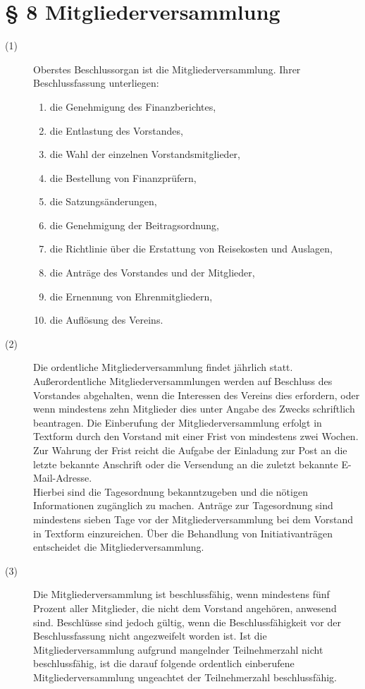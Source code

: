 \documentclass[12pt,paper=a4,ngerman]{scrreprt}
\begin{document}
\section{\S{} 8 Mitgliederversammlung}
\begin{description}
	\item[(1)] Oberstes Beschlussorgan ist die Mitgliederversammlung. Ihrer Beschlussfassung unterliegen:
	\begin{enumerate}
		\item die Genehmigung des Finanzberichtes,
		\item die Entlastung des Vorstandes,
		\item die Wahl der einzelnen Vorstandsmitglieder,
		\item die Bestellung von Finanzprüfern,
		\item die Satzungsänderungen,
		\item die Genehmigung der Beitragsordnung,
		\item die Richtlinie über die Erstattung von Reisekosten und Auslagen,
		\item die Anträge des Vorstandes und der Mitglieder,
		\item die Ernennung von Ehrenmitgliedern,
		\item die Auflösung des Vereins.
	\end{enumerate}
\item[(2)] Die ordentliche Mitgliederversammlung findet jährlich statt. Außerordentliche Mitgliederversammlungen werden auf Beschluss des Vorstandes abgehalten, wenn die Interessen des Vereins dies erfordern, oder wenn mindestens zehn Mitglieder dies unter Angabe des Zwecks schriftlich beantragen. Die Einberufung der Mitgliederversammlung erfolgt in Textform durch den Vorstand mit einer Frist von mindestens zwei Wochen. Zur Wahrung der Frist reicht die Aufgabe der Einladung zur Post an die letzte bekannte Anschrift oder die Versendung an die zuletzt bekannte E-Mail-Adresse.\\
Hierbei sind die Tagesordnung bekanntzugeben und die nötigen Informationen zugänglich zu machen. Anträge zur Tagesordnung sind mindestens sieben Tage vor der Mitgliederversammlung bei dem Vorstand in Textform einzureichen. Über die Behandlung von Initiativanträgen entscheidet die Mitgliederversammlung.
\item[(3)] Die Mitgliederversammlung ist beschlussfähig, wenn mindestens fünf Prozent aller Mitglieder, die nicht dem Vorstand angehören, anwesend sind. Beschlüsse sind jedoch gültig, wenn die Beschlussfähigkeit vor der Beschlussfassung nicht angezweifelt worden ist. Ist die Mitgliederversammlung aufgrund mangelnder Teilnehmerzahl nicht beschlussfähig, ist die darauf folgende ordentlich einberufene Mitgliederversammlung ungeachtet der Teilnehmerzahl beschlussfähig.

\end{description}
\end{document}
